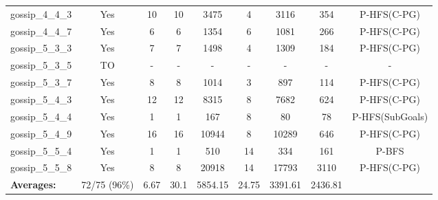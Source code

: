 \documentclass{article}
\begin{document}
\begin{tabular}{lcccccccc}
gossip\_4\_4\_3 & Yes & 10 & 10 & 3475 & 4 & 3116 & 354 & P-HFS(C-PG) \\
gossip\_4\_4\_7 & Yes & 6 & 6 & 1354 & 6 & 1081 & 266 & P-HFS(C-PG) \\
gossip\_5\_3\_3 & Yes & 7 & 7 & 1498 & 4 & 1309 & 184 & P-HFS(C-PG) \\
gossip\_5\_3\_5 & TO & - & - & - & - & - & - & - \\
gossip\_5\_3\_7 & Yes & 8 & 8 & 1014 & 3 & 897 & 114 & P-HFS(C-PG) \\
gossip\_5\_4\_3 & Yes & 12 & 12 & 8315 & 8 & 7682 & 624 & P-HFS(C-PG) \\
gossip\_5\_4\_4 & Yes & 1 & 1 & 167 & 8 & 80 & 78 & P-HFS(SubGoals) \\
gossip\_5\_4\_9 & Yes & 16 & 16 & 10944 & 8 & 10289 & 646 & P-HFS(C-PG) \\
gossip\_5\_5\_4 & Yes & 1 & 1 & 510 & 14 & 334 & 161 & P-BFS \\
gossip\_5\_5\_8 & Yes & 8 & 8 & 20918 & 14 & 17793 & 3110 & P-HFS(C-PG) \\
\textbf{Averages:} & 72/75 (96\%) & 6.67 & 30.1 & 5854.15 & 24.75 & 3391.61 & 2436.81 & \\
\bottomrule
\end{tabular}
\\[0.7cm]
\end{document}
